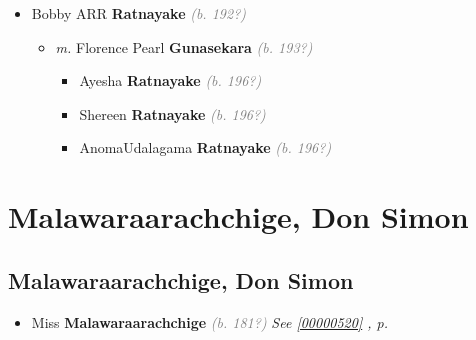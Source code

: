 \documentclass[10pt, openany]{book}
\begin{document}
\begin{itemize}
{\begin{itemize}
{\begin{itemize}
{\begin{itemize}
{\begin{itemize}
{\begin{itemize}
\end{itemize}}
\end{itemize}
 }
\end{itemize}}
\end{itemize}
  }
\item{Bobby ARR \textbf{Ratnayake} \textcolor{gray}{\textit{(b. 192?)}}
\begin{itemize}
\item{\textit{m.} Florence Pearl \textbf{Gunasekara} \textcolor{gray}{\textit{(b. 193?)}}   \label{couple:00000213:00000648} \begin{itemize}
\item{Ayesha \textbf{Ratnayake} \textcolor{gray}{\textit{(b. 196?)}}
 }
\item{Shereen \textbf{Ratnayake} \textcolor{gray}{\textit{(b. 196?)}}
 }
\item{AnomaUdalagama \textbf{Ratnayake} \textcolor{gray}{\textit{(b. 196?)}}
 }
\end{itemize}}
\end{itemize}
  }
\end{itemize}}
\end{itemize}
   
\part{Malawaraarachchige, Don Simon}
\chapter{Malawaraarachchige, Don Simon}
\label{00000519}
\textcolor{slmaroon}{\textit{}}
\begin{itemize}
\item{Miss \textbf{Malawaraarachchige} \textcolor{gray}{\textit{(b. 181?)}} \textcolor{slteal}{\textit{See  \autoref{00000520} \textit{, p. \pageref{00000520} }}}}
\end{itemize}
  
\end{document}
